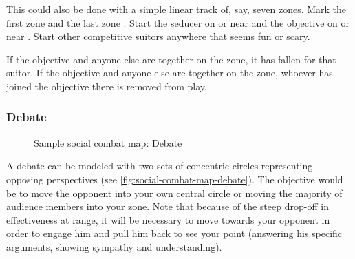 This could also be done with a simple linear track of, say, seven zones. Mark the first zone \LOVERS{} and the last zone \JUSTFRIENDS{}. Start the seducer on or near \LOVERS{} and the objective on or near \JUSTFRIENDS{}. Start other competitive suitors anywhere that seems fun or scary.

If the objective and anyone else are together on the \LOVERS{} zone, it has fallen for that suitor. If the objective and anyone else are together on the \JUSTFRIENDS{} zone, whoever has joined the objective there is removed from play.


\subsubsection{Debate}

\begin{figure}
\centering\footnotesize

\caption{Sample social combat map: Debate}
\label{fig:social-combat-map-debate}
\end{figure}


A debate can be modeled with two sets of concentric circles representing opposing perspectives (see \autoref{fig:social-combat-map-debate}). The objective would be to move the opponent into your own central circle or moving the majority of audience members into your zone. Note that because of the steep drop-off in effectiveness at range, it will be necessary to move towards your opponent in order to engage him and pull him back to see your point (answering his specific arguments, showing sympathy and understanding).

